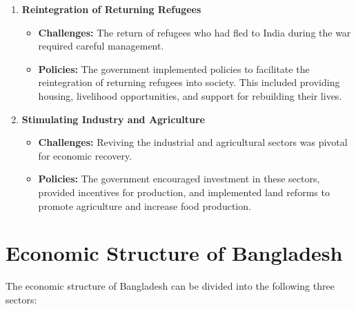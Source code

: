 \begin{enumerate}
	\item\textbf{Reintegration of Returning Refugees}
	\begin{itemize}
		\item\textbf{Challenges:} The return of refugees who had fled to India during 
		the war required careful management.
		\item\textbf{Policies:} The government implemented policies to facilitate 
		the reintegration of returning refugees into society. This included providing housing, 
		livelihood opportunities, and support for rebuilding their lives.
	\end{itemize}
	
	\item\textbf{Stimulating Industry and Agriculture}
	\begin{itemize}
		\item\textbf{Challenges:} Reviving the industrial and agricultural sectors was pivotal 
		for economic recovery.
		\item\textbf{Policies:} The government encouraged investment in these sectors, 
		provided incentives for production, and implemented land reforms to promote 
		agriculture and increase food production.
	\end{itemize}
	
\end{enumerate}


\section{Economic Structure of Bangladesh}
The economic structure of Bangladesh can be divided into the following three sectors:

